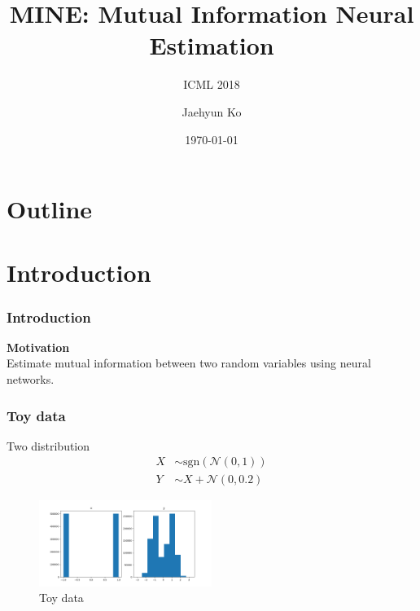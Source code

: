 \documentclass[aspectratio=169]{beamer}
\begin{document}
\begin{frame}
	\title{MINE: Mutual Information Neural Estimation}
	\subtitle{ICML 2018}
	\author{Jaehyun Ko}
	\date{\today}
	\titlepage
\end{frame}


\section*{Outline}
\begin{frame}
\tableofcontents
\end{frame}



\section{Introduction}
\begin{frame}
	\frametitle{Introduction}
	\textbf{Motivation} \\ Estimate mutual information between two random variables using neural networks. \\
\end{frame}


\begin{frame}
	\frametitle{Toy data}
	Two distribution
	\begin{align*}
		X &\sim \text{sgn}(\mathcal{N}(0,1)) \\
		Y &\sim X+\mathcal{N}(0, 0.2)
	\end{align*}
	\begin{figure}
		\centering
		\includegraphics[width=0.5\textwidth]{./images/toy_data.png}
		\caption{Toy data}
		\label{fig:toy_data}
	\end{figure}
\end{frame}
\end{document}
